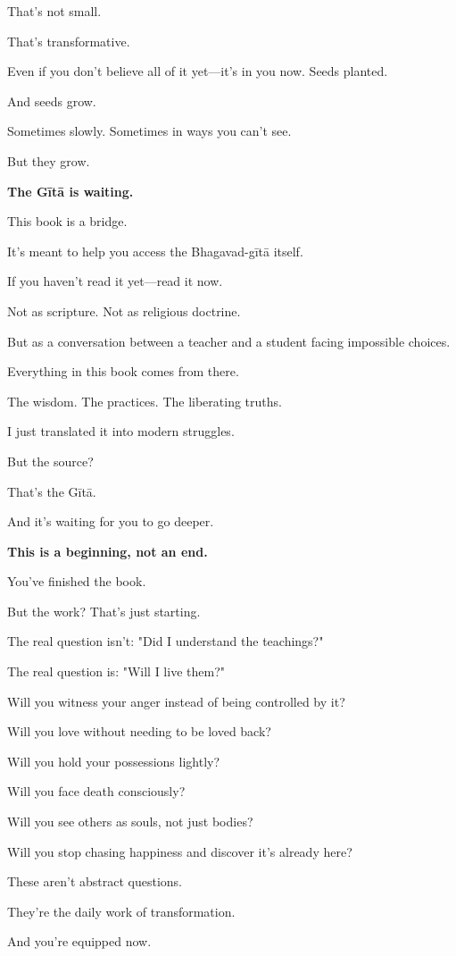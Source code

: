 \documentclass[11pt,twoside]{book}
\begin{document}
That's not small.

That's transformative.

Even if you don't believe all of it yet—it's in you now. Seeds planted.

And seeds grow.

Sometimes slowly. Sometimes in ways you can't see.

But they grow.

\textbf{\textbf{The Gītā is waiting.}}

This book is a bridge.

It's meant to help you access the Bhagavad-gītā itself.

If you haven't read it yet—read it now.

Not as scripture. Not as religious doctrine.

But as a conversation between a teacher and a student facing impossible choices.

Everything in this book comes from there.

The wisdom. The practices. The liberating truths.

I just translated it into modern struggles.

But the source?

That's the Gītā.

And it's waiting for you to go deeper.

\textbf{\textbf{This is a beginning, not an end.}}

You've finished the book.

But the work? That's just starting.

The real question isn't: "Did I understand the teachings?"

The real question is: "Will I live them?"

Will you witness your anger instead of being controlled by it?

Will you love without needing to be loved back?

Will you hold your possessions lightly?

Will you face death consciously?

Will you see others as souls, not just bodies?

Will you stop chasing happiness and discover it's already here?

These aren't abstract questions.

They're the daily work of transformation.

And you're equipped now.
\end{document}
